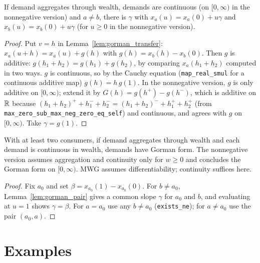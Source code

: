 \begin{lemma}
\label{lem:gorman_pair}
\leanok
{}
If demand aggregates through wealth, demands are continuous (on $[0,\infty)$ in the nonnegative version) and $a \ne b$,
there is $\gamma$ with $x_a(u) = x_a(0) + u\gamma$ and $x_b(u) = x_b(0) + u \gamma$ (for $u \ge 0$ in the nonnegative
version).
\end{lemma}
\begin{proof}
\leanok
Put $v = h$ in Lemma~\ref{lem:gorman_transfer}: $x_a(u + h) = x_a(u) + g(h)$ with $g(h) = x_b(h) - x_b(0)$. Then $g$ is
additive: $g(h_1 + h_2) = g(h_1) + g(h_2)$, by comparing $x_a(h_1 + h_2)$ computed in two ways. $g$ is continuous, so by
the Cauchy equation (\texttt{map\_real\_smul} for a continuous additive map) $g(h) = h\, g(1)$. In the nonnegative
version, $g$ is only additive on $[0, \infty)$; extend it by $G(h) = g(h^+) - g(h^-)$, which is additive on $\mathbb{R}$ because
$(h_1+h_2)^+ + h_1^- + h_2^- = (h_1+h_2)^- + h_1^+ + h_2^+$ (from \texttt{max\_zero\_sub\_max\_neg\_zero\_eq\_self}) and
continuous, and agrees with $g$ on $[0,\infty)$. Take $\gamma = g(1)$.
\end{proof}

\begin{theorem}
\label{thm:gorman}
\leanok
{}
With at least two consumers, if demand aggregates through wealth and each demand is continuous in wealth, demands have
Gorman form. The nonnegative version assumes aggregation and continuity only for $w \ge 0$ and concludes the Gorman form on
$[0, \infty)$. MWG assumes differentiability; continuity suffices here.
\end{theorem}
\begin{proof}
\leanok
{}
Fix $a_0$ and set $\beta = x_{a_0}(1) - x_{a_0}(0)$. For $b \ne a_0$, Lemma~\ref{lem:gorman_pair} gives a common slope
$\gamma$ for $a_0$ and $b$, and evaluating at $u = 1$ shows $\gamma = \beta$. For $a = a_0$ use any $b \ne a_0$
(\texttt{exists\_ne}); for $a \ne a_0$ use the pair $(a_0, a)$.
\end{proof}

\section{Examples}
\label{sec:aggregation_examples}

